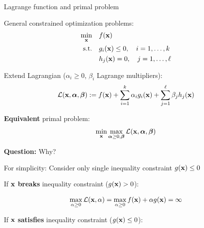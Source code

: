\documentclass[11pt,compress,t,notes=noshow, xcolor=table]{beamer}
\begin{document}





\begin{vbframe}{Lagrange function and primal problem}

General constrained optimization problems:
\begin{align*}
    \min_{\mathbf{x}} \quad& f(\mathbf{x}) \\
    \text{s.t.} \quad& g_i(\mathbf{x}) \leq 0, \quad i = 1, \ldots ,k \\
    & h_j(\mathbf{x}) = 0, \quad j = 1, \ldots, \ell
\end{align*}

Extend Lagrangian ($\alpha_i\ge 0$, $\beta_i$ Lagrange multipliers):
\begin{equation*}
    \mathcal{L}(\mathbf{x}, \bm{\alpha}, \bm{\beta}) := f(\mathbf{x}) + \sum_{i=1}^k \alpha_i g_i(\mathbf{x}) + \sum_{j=1}^\ell \beta_j h_j(\mathbf{x})
\end{equation*}

\textbf{Equivalent} primal problem:
\begin{equation*}
    \min_{\mathbf{x}} \max_{\bm{\alpha}\ge 0, \bm{\beta}}  \mathcal{L}(\mathbf{x}, \bm{\alpha}, \bm{\beta})
\end{equation*}

\textbf{Question:} Why?

\framebreak

For simplicity: Consider only single inequality constraint $g(\mathbf{x}) \leq 0$

\vspace*{0.2cm} 

If $\mathbf{x}$ \textbf{breaks} inequality constraint ($g(\mathbf{x}) > 0$):

\begin{equation*}
	\max_{\alpha \ge 0} \mathcal{L}(\mathbf{x}, \alpha) = \max_{\alpha \ge 0} f(\mathbf{x}) +  \alpha g(\mathbf{x}) = \infty
\end{equation*}

If $\mathbf{x}$ \textbf{satisfies} inequality constraint ($g(\mathbf{x}) \le 0$):


\end{vbframe}
\end{document}
